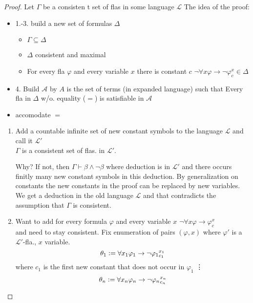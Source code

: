 \begin{proof}
    Let $\Gamma$ be a consisten t set of flas in some language $\mathcal{L}$
    The idea of the proof:
    \begin{itemize}
        \item 1.-3. build a new set of formulas $\Delta$
        \begin{itemize}
            \item $\Gamma \subseteq \Delta$
            \item $\Delta$ consistent and maximal
            \item For every fla $\varphi$ and every variable $x$ there is constant $c$ $\lnot \forall x \varphi\to \lnot \varphi^x_c\in \Delta$
        \end{itemize}
        \item 4. Build $\mathcal{A}$ by $A$ is the set of terms (in expanded language) such that
        Every fla in $\Delta$ w/o. equality ($=$) is satisfiable in $\mathcal{A}$
        \item accomodate $=$
    \end{itemize}
    \begin{enumerate}
        \item Add a countable infinite set of new constant symbols to the language $\mathcal{L}$ and call it $\mathcal{L}'$\\
        $\Gamma$ is a consistent set of flas. in $\mathcal{L}'$.
        \begin{claimproof}
            Why? If not, then $\Gamma\vdash \beta \land \lnot \beta$ where deduction is in $\mathcal{L}'$ 
            and there occurs finitly many new constant symbols in this deduction.
            By generalization on constants the new constants in the proof can be replaced by new variables. We get a 
            deduction in the old language $\mathcal{L}$ and that contradicts the assumption that $\Gamma$ is consistent.
        \end{claimproof}
        \item Want to add for every formula $\varphi$ and every variable $x$ $\lnot \forall x \varphi\to \varphi^x_c$ \\
        and need to stay consistent. Fix enumeration of pairs $(\varphi, x)$ where $\varphi'$ is a $\mathcal{L}'$-fla., $x$ variable.
        $$\theta_1 \vcentcolon= \forall x_1 \varphi_1 \to \lnot{\varphi_1}^{x_1}_{c_1}$$
        where $c_1$ is the first new constant that does not occur in $\varphi_1$
        \vdots
        $$\theta_n \vcentcolon= \forall x_n \varphi_n \to \lnot{\varphi_n}^{x_n}_{c_n}$$

\end{enumerate}
\end{proof}
